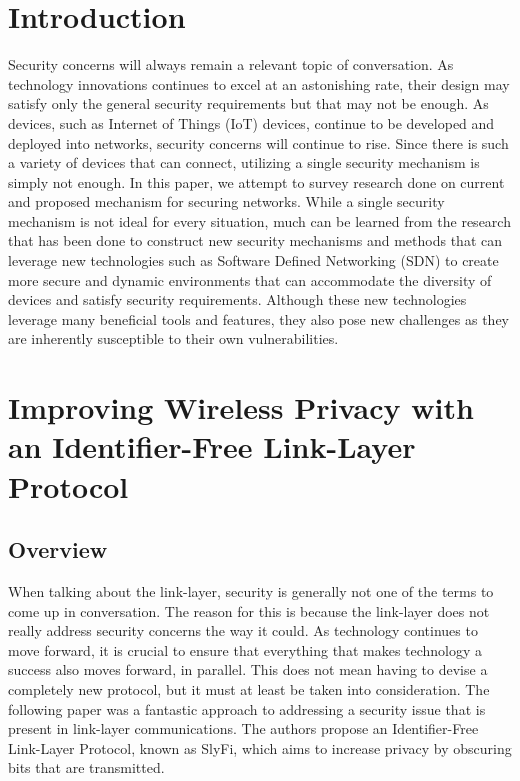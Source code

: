 
\section {Introduction}

Security concerns will always remain a relevant topic of conversation. As technology innovations continues to excel at an astonishing rate, their design may satisfy only the general security requirements but that may not be enough. As devices, such as Internet of Things (IoT) devices, continue to be developed and deployed into networks, security concerns will continue to rise. Since there is such a variety of devices that can connect, utilizing a single security mechanism is simply not enough. In this paper, we attempt to survey research done on current and proposed mechanism for securing networks. While a single security mechanism is not ideal for every situation, much can be learned from the research that has been done to construct new security mechanisms and methods that can leverage new technologies such as Software Defined Networking (SDN) to create more secure and dynamic environments that can accommodate the diversity of devices and satisfy security requirements. Although these new technologies leverage many beneficial tools and features, they also pose new challenges as they are inherently susceptible to their own vulnerabilities. 

\section {Improving Wireless Privacy with an Identifier-Free Link-Layer Protocol}
\subsection {Overview}

When talking about the link-layer, security is generally not one of the terms to come up in conversation. The reason for this is because the link-layer does not really address security concerns the way it could. As technology continues to move forward, it is crucial to ensure that everything that makes technology a success also moves forward, in parallel. This does not mean having to devise a completely new protocol, but it must at least be taken into consideration. The following paper was a fantastic approach to addressing a security issue that is present in link-layer communications. The authors propose an Identifier-Free Link-Layer Protocol, known as SlyFi, which aims to increase privacy by obscuring bits that are transmitted.

